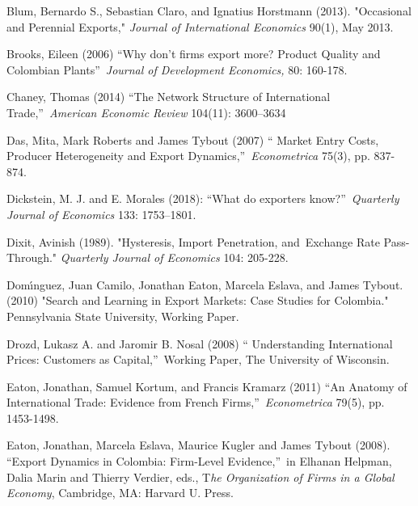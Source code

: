 \documentclass[12pt]{article}
\begin{document}
\begin{description}
\item Blum, Bernardo S., Sebastian Claro, and Ignatius Horstmann (2013).
"Occasional and Perennial Exports," \textit{Journal of International
Economics} 90(1), May 2013.

\item Brooks, Eileen (2006) \textquotedblleft Why don't firms export more?
Product Quality and Colombian Plants\textquotedblright\ \textit{Journal of
Development Economics,} 80: 160-178.

\item Chaney, Thomas (2014) \textquotedblleft The Network Structure of
International Trade,\textquotedblright\ \textit{American Economic Review}
104(11): 3600--3634

\item Das, Mita, Mark Roberts and James Tybout (2007) \textquotedblleft
Market Entry Costs, Producer Heterogeneity and Export
Dynamics,\textquotedblright\ \textit{Econometrica }75(3), pp. 837-874.

\item Dickstein, M. J. and E. Morales (2018): \textquotedblleft What do
exporters know?\textquotedblright\ \textit{Quarterly Journal of Economics}
133: 1753--1801.

\item Dixit, Avinish (1989). "Hysteresis, Import Penetration, and\ Exchange
Rate Pass-Through." \textit{Quarterly Journal of Economics} 104: 205-228.

\item Dom\'{\i}nguez, Juan Camilo, Jonathan Eaton, Marcela Eslava, and James
Tybout. (2010) "Search and Learning in Export Markets: Case Studies for
Colombia." Pennsylvania State University, Working Paper.

\item Drozd, Lukasz A. and Jaromir B. Nosal (2008) \textquotedblleft
Understanding International Prices: Customers as Capital,\textquotedblright\
Working Paper, The University of Wisconsin.

\item Eaton, Jonathan, Samuel Kortum, and Francis Kramarz (2011)
\textquotedblleft An Anatomy of International Trade: Evidence from French
Firms,\textquotedblright\ \textit{Econometrica} 79(5), pp. 1453-1498.

\item Eaton, Jonathan, Marcela Eslava, Maurice Kugler and James Tybout
(2008). \textquotedblleft Export Dynamics in Colombia: Firm-Level
Evidence,\textquotedblright\ in Elhanan Helpman, Dalia Marin and Thierry
Verdier, eds., T\textit{he Organization of Firms in a Global Economy},
Cambridge, MA: Harvard U. Press.


\end{description}
\end{document}
